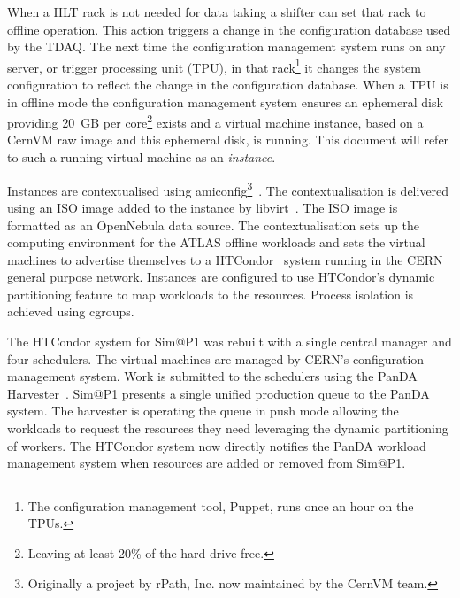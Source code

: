 \documentclass{webofc}
\begin{document}
When a HLT rack is not needed for data taking a shifter can set that rack to
offline operation. This action triggers a change in the configuration database
used by
the TDAQ. The next time the configuration management system runs on any server,
or trigger processing unit (TPU), in that rack\footnote{The configuration
management tool, Puppet, runs once an
hour on the TPUs.} it changes the system configuration to reflect the change
in the configuration database. When a TPU is in offline mode the configuration
management system ensures an ephemeral
disk providing 20~\textrm{GB} per core\footnote{Leaving at least 20\% of the
hard drive free.} exists and a virtual machine instance, based on a CernVM raw
image and this ephemeral disk, is running. This document will refer to such a
running virtual machine as an \textit{instance}.

Instances are contextualised using amiconfig\footnote{Originally a
project by rPath, Inc. now maintained by the CernVM team.}~\cite{amiconfig}.
The contextualisation is delivered using an ISO image added to the instance
by libvirt~\cite{libvirt}. The ISO image is formatted as an OpenNebula data
source. The
contextualisation sets up the computing environment for the ATLAS offline
workloads and sets the virtual machines to advertise themselves to a
HTCondor~\cite{condor} system running in the CERN general purpose network.
Instances are configured to use HTCondor's dynamic partitioning feature to
map workloads to the resources. Process isolation is achieved using cgroups.

The HTCondor system for Sim@P1 was rebuilt with a single central manager and
four schedulers. The virtual machines are managed by CERN's configuration
management system. Work is submitted to the schedulers using the PanDA
Harvester~\cite{harvester}. Sim@P1 presents a single unified production queue to
the PanDA system. The harvester is operating the queue in push mode allowing the
workloads to request the resources they need leveraging the dynamic partitioning
of workers.  The HTCondor system now directly notifies the PanDA workload
management system when resources are added or removed from Sim@P1.
\end{document}
